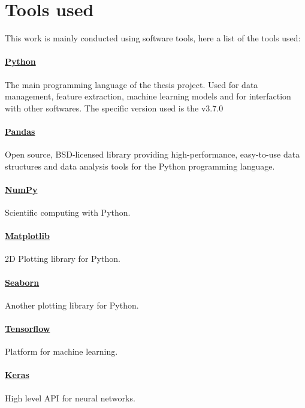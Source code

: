 \documentclass[%
    corpo=12pt,
    twoside,
    oldstyle,
    autoretitolo,
    greek,
    evenboxes,
]{toptesi}
\begin{document}
\section{Tools used}
This work is mainly conducted using software tools, here a list of the tools used:

\paragraph{\href{https://www.python.org/}{Python}} The main programming language of the thesis project. Used for data management, feature extraction, machine learning models and for interfaction with other softwares. The specific version used is the v3.7.0

\paragraph{\href{https://pandas.pydata.org/}{Pandas}} Open source, BSD-licensed library providing high-performance, easy-to-use data structures and data analysis tools for the Python programming language.

\paragraph{\href{https://numpy.org/}{NumPy}} Scientific computing with Python.

\paragraph{\href{https://matplotlib.org/}{Matplotlib}} 2D Plotting library for Python.

\paragraph{\href{https://seaborn.pydata.org/}{Seaborn}} Another plotting library for Python.

\paragraph{\href{https://www.tensorflow.org/}{Tensorflow}} Platform for machine learning.

\paragraph{\href{https://keras.io/}{Keras}} High level API for neural networks.
\end{document}
